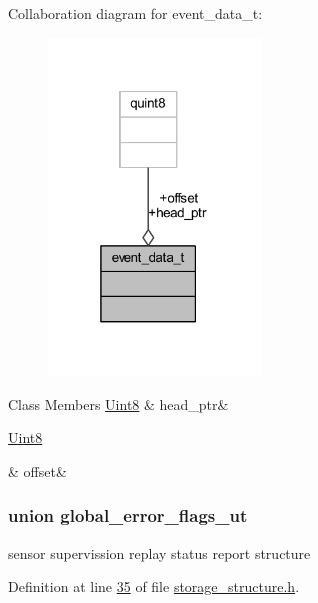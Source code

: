Collaboration diagram for event\+\_\+data\+\_\+t\+:
\nopagebreak
\begin{figure}[H]
\begin{center}
\leavevmode
\includegraphics[width=160pt]{d3/dd1/a00214}
\end{center}
\end{figure}
\begin{DoxyFields}{Class Members}
\hypertarget{a00003_abcdcf9a1889bf0892658828ceac54668}{\hyperlink{a00001_a979e3e23b9a449e69ab6a8a83b6042f8}{Uint8}}\label{a00003_abcdcf9a1889bf0892658828ceac54668}
&
head\+\_\+ptr&
\\
\hline

\hypertarget{a00003_a90588fed720ad404c18bcbb8fa84878e}{\hyperlink{a00001_a979e3e23b9a449e69ab6a8a83b6042f8}{Uint8}}\label{a00003_a90588fed720ad404c18bcbb8fa84878e}
&
offset&
\\
\hline

\end{DoxyFields}
\label{db/df8/a00076}
\hypertarget{a00003_db/df8/a00076}{}
\subsubsection{union global\+\_\+error\+\_\+flags\+\_\+ut}
sensor supervission replay status report structure 

Definition at line \hyperlink{a00003_source_l00035}{35} of file \hyperlink{a00003_source}{storage\+\_\+structure.\+h}.



